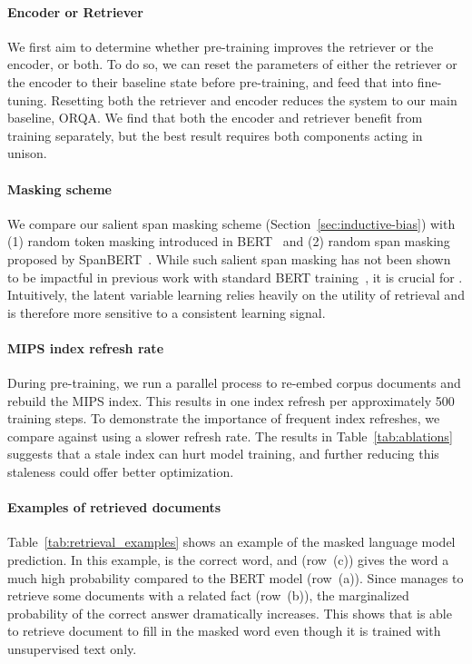 \documentclass{article}
\begin{document}
\paragraph{Encoder or Retriever}
We first aim to determine whether \thename pre-training improves the retriever or the encoder, or both. To do so, we can reset the parameters of either the retriever or the encoder to their baseline state before \thename pre-training, and feed that into fine-tuning. Resetting both the retriever and encoder reduces the system to our main baseline, ORQA. We find that both the encoder and retriever benefit from \thename training separately, but the best result requires both components acting in unison.

\paragraph{Masking scheme}
We compare our salient span masking scheme (Section~\ref{sec:inductive-bias})
with (1) random token masking introduced in BERT~\cite{bert}
and (2) random span masking proposed by SpanBERT~\cite{spanbert}. 
While such salient span masking has not been shown to be impactful in previous work with standard BERT training~\cite{spanbert}, it is crucial for \thename. Intuitively, the latent variable learning relies heavily on the utility of retrieval and is therefore more sensitive to a consistent learning signal.

\paragraph{MIPS index refresh rate}
During pre-training, we run a parallel process to re-embed corpus documents and rebuild the MIPS index.
This results in one index refresh per approximately 500 training steps.
To demonstrate the importance of frequent index refreshes,
we compare against using a slower refresh rate.
The results in Table~\ref{tab:ablations} suggests that a stale index can hurt model training, and further reducing this staleness could offer better optimization.




\paragraph{Examples of retrieved documents}
Table~\ref{tab:retrieval_examples} shows an example of
the \thename masked language model prediction.
In this example, 
is the correct word, and \thename (row~(c)) gives the word a much high probability
compared to the BERT model (row~(a)).
Since \thename manages to retrieve some documents with a related fact (row~(b)), the marginalized probability of the correct answer dramatically increases. This shows that \thename
is able to retrieve document to fill in the masked word even though it is trained with unsupervised text only.
\end{document}
